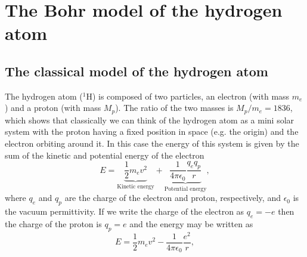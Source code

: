 

\section{The Bohr model of the hydrogen atom}

\subsection{The classical model of the hydrogen atom}
The hydrogen atom ($^1$H) is composed of two particles, an electron (with mass $m_e$) and a proton (with mass $M_p$).
The ratio of the two masses is $M_p/m_e = 1836$, which shows that classically we can think of the hydrogen atom as a mini solar system with the proton having a fixed position in space (e.g. the origin) and the electron orbiting around it.
In this case the energy of this system is given by the sum of the kinetic and potential energy of the electron
\begin{equation}
E = \underbrace{\frac{1}{2} m_e v^2}_{\text{Kinetic energy}}
+ \underbrace{\frac{1}{4 \pi \epsilon_0} \frac{q_e q_p}{r}}_{\text{Potential energy}},
\end{equation}
where $q_e$ and $q_p$ are the charge of the electron and proton, respectively, and $\epsilon_0$ is the vacuum permittivity.
If we write the charge of the electron as $q_e = -e$ then the charge of the proton is $q_p = e$ and the energy may be written as
\begin{equation}
E = \frac{1}{2} m_e v^2 - \frac{1}{4 \pi \epsilon_0} \frac{e^2}{r},
\end{equation}

